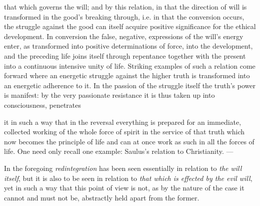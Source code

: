 \documentclass[12pt,a4paper]{book}
\begin{document}
that which governs the will; and by this relation, in that the direction of will
is transformed in the good's breaking through, i.e. in that the conversion
occurs, the struggle against the good can itself acquire positive significance
for the ethical development. In conversion the false, negative, expressions of
the will's energy enter, as transformed into positive determinations of force,
into the development, and the preceding life joins itself through repentance
together with the present into a continuous intensive unity of life. Striking
examples of such a relation come forward where an energetic struggle against the
higher truth is transformed into an energetic adherence to it. In the passion of
the struggle itself the truth's power is manifest: by the very passionate
resistance it is thus taken up into consciousness, penetrates

it in such a way that in the reversal everything is prepared for an immediate,
collected working of the whole force of spirit in the service of that truth
which now becomes the principle of life and can at once work as such in all the
forces of life. One need only recall one example: Saulus's relation to
Christianity. ---

In the foregoing \emph{redintegration} has been seen essentially in relation to
\emph{the will itself}, but it is also to be seen in relation to \emph{that
which is effected by the evil will}, yet in such a way that this point of view
is not, as by the nature of the case it cannot and must not be, abstractly held
apart from the former.
\end{document}
